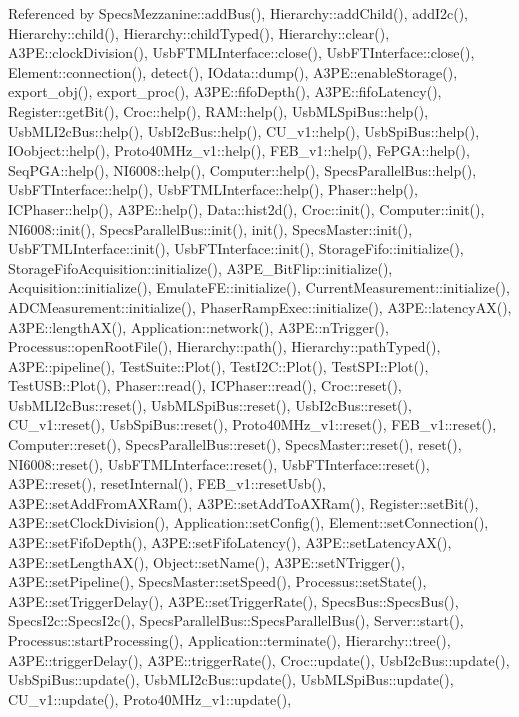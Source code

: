 Referenced by Specs\+Mezzanine\+::add\+Bus(), Hierarchy\+::add\+Child(), add\+I2c(), Hierarchy\+::child(), Hierarchy\+::child\+Typed(), Hierarchy\+::clear(), A3\+P\+E\+::clock\+Division(), Usb\+F\+T\+M\+L\+Interface\+::close(), Usb\+F\+T\+Interface\+::close(), Element\+::connection(), detect(), I\+Odata\+::dump(), A3\+P\+E\+::enable\+Storage(), export\+\_\+obj(), export\+\_\+proc(), A3\+P\+E\+::fifo\+Depth(), A3\+P\+E\+::fifo\+Latency(), Register\+::get\+Bit(), Croc\+::help(), R\+A\+M\+::help(), Usb\+M\+L\+Spi\+Bus\+::help(), Usb\+M\+L\+I2c\+Bus\+::help(), Usb\+I2c\+Bus\+::help(), C\+U\+\_\+v1\+::help(), Usb\+Spi\+Bus\+::help(), I\+Oobject\+::help(), Proto40\+M\+Hz\+\_\+v1\+::help(), F\+E\+B\+\_\+v1\+::help(), Fe\+P\+G\+A\+::help(), Seq\+P\+G\+A\+::help(), N\+I6008\+::help(), Computer\+::help(), Specs\+Parallel\+Bus\+::help(), Usb\+F\+T\+Interface\+::help(), Usb\+F\+T\+M\+L\+Interface\+::help(), Phaser\+::help(), I\+C\+Phaser\+::help(), A3\+P\+E\+::help(), Data\+::hist2d(), Croc\+::init(), Computer\+::init(), N\+I6008\+::init(), Specs\+Parallel\+Bus\+::init(), init(), Specs\+Master\+::init(), Usb\+F\+T\+M\+L\+Interface\+::init(), Usb\+F\+T\+Interface\+::init(), Storage\+Fifo\+::initialize(), Storage\+Fifo\+Acquisition\+::initialize(), A3\+P\+E\+\_\+\+Bit\+Flip\+::initialize(), Acquisition\+::initialize(), Emulate\+F\+E\+::initialize(), Current\+Measurement\+::initialize(), A\+D\+C\+Measurement\+::initialize(), Phaser\+Ramp\+Exec\+::initialize(), A3\+P\+E\+::latency\+A\+X(), A3\+P\+E\+::length\+A\+X(), Application\+::network(), A3\+P\+E\+::n\+Trigger(), Processus\+::open\+Root\+File(), Hierarchy\+::path(), Hierarchy\+::path\+Typed(), A3\+P\+E\+::pipeline(), Test\+Suite\+::\+Plot(), Test\+I2\+C\+::\+Plot(), Test\+S\+P\+I\+::\+Plot(), Test\+U\+S\+B\+::\+Plot(), Phaser\+::read(), I\+C\+Phaser\+::read(), Croc\+::reset(), Usb\+M\+L\+I2c\+Bus\+::reset(), Usb\+M\+L\+Spi\+Bus\+::reset(), Usb\+I2c\+Bus\+::reset(), C\+U\+\_\+v1\+::reset(), Usb\+Spi\+Bus\+::reset(), Proto40\+M\+Hz\+\_\+v1\+::reset(), F\+E\+B\+\_\+v1\+::reset(), Computer\+::reset(), Specs\+Parallel\+Bus\+::reset(), Specs\+Master\+::reset(), reset(), N\+I6008\+::reset(), Usb\+F\+T\+M\+L\+Interface\+::reset(), Usb\+F\+T\+Interface\+::reset(), A3\+P\+E\+::reset(), reset\+Internal(), F\+E\+B\+\_\+v1\+::reset\+Usb(), A3\+P\+E\+::set\+Add\+From\+A\+X\+Ram(), A3\+P\+E\+::set\+Add\+To\+A\+X\+Ram(), Register\+::set\+Bit(), A3\+P\+E\+::set\+Clock\+Division(), Application\+::set\+Config(), Element\+::set\+Connection(), A3\+P\+E\+::set\+Fifo\+Depth(), A3\+P\+E\+::set\+Fifo\+Latency(), A3\+P\+E\+::set\+Latency\+A\+X(), A3\+P\+E\+::set\+Length\+A\+X(), Object\+::set\+Name(), A3\+P\+E\+::set\+N\+Trigger(), A3\+P\+E\+::set\+Pipeline(), Specs\+Master\+::set\+Speed(), Processus\+::set\+State(), A3\+P\+E\+::set\+Trigger\+Delay(), A3\+P\+E\+::set\+Trigger\+Rate(), Specs\+Bus\+::\+Specs\+Bus(), Specs\+I2c\+::\+Specs\+I2c(), Specs\+Parallel\+Bus\+::\+Specs\+Parallel\+Bus(), Server\+::start(), Processus\+::start\+Processing(), Application\+::terminate(), Hierarchy\+::tree(), A3\+P\+E\+::trigger\+Delay(), A3\+P\+E\+::trigger\+Rate(), Croc\+::update(), Usb\+I2c\+Bus\+::update(), Usb\+Spi\+Bus\+::update(), Usb\+M\+L\+I2c\+Bus\+::update(), Usb\+M\+L\+Spi\+Bus\+::update(), C\+U\+\_\+v1\+::update(), Proto40\+M\+Hz\+\_\+v1\+::update(), 